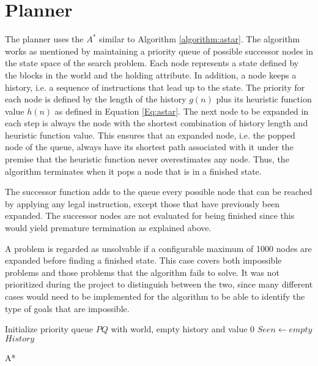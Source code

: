 \section{Planner}
The planner uses the $A^*$ similar to Algorithm \ref{algorithm:astar}. The
algorithm works as mentioned by maintaining a priority queue of possible
successor nodes in the state space of the search problem. Each node represents a
state defined by the blocks in the world and the holding attribute. In addition,
a node keeps a history, i.e. a sequence of instructions that lead up to the
state. The priority for each node is defined by the length of the history $g(n)$ plus
its heuristic function value $h(n)$ as defined in Equation \ref{Eq:astar}. The next node to be expanded in each step is
always the node with the shortest combination of history length and heuristic
function value. This ensures that an expanded node, i.e. the popped node of the
queue, always have its shortest path associated with it under the premise that
the heuristic function never overestimates any node. Thus, the algorithm
terminates when it pops a node that is in a finished state. 

The successor function adds to the queue every possible node that can be reached
by applying any legal instruction, except those that have previously been
expanded. The successor nodes are not evaluated for being finished since this
would yield premature termination as explained above.

A problem is regarded as unsolvable if a configurable maximum of 1000 nodes are
expanded before finding a finished state. This case covers both impossible
problems and those problems that the algorithm fails to solve. It was not
prioritized during the project to distinguish between the two, since many
different cases would need to be implemented for the algorithm to be able to
identify the type of goals that are impossible. 

\begin{algorithm}[h!]
 \SetAlgoLined
 Initialize priority queue $PQ$ with world, empty history and value 0\;
 $Seen \leftarrow empty$\;
 \Return $History$
 \caption{A*}
 \label{algorithm:astar}
\end{algorithm} 

